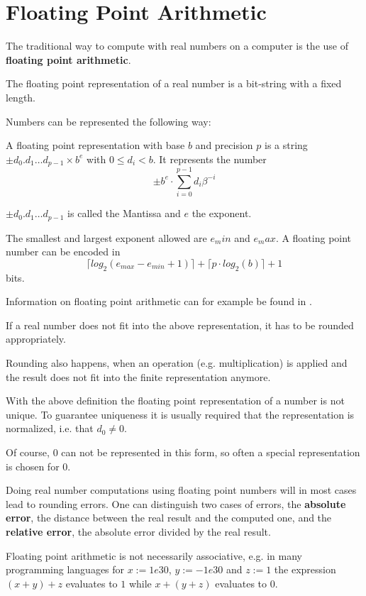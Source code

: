 \section{Floating Point Arithmetic}
The traditional way to compute with real numbers on a computer is the use 
of \textbf{floating point arithmetic}. 

The floating point representation of a real number is a bit-string with a fixed
length.

Numbers can be represented the following way:
\begin{definition}\label{def: floating point number}
	A floating point representation with base $b$ and precision $p$
	is a string $\pm d_0 . d_1 \dots d_{p-1} \times b^e$ with $0 \leq d_i < b$.	
	It represents the number
	$$ \pm b^e \cdot \sum_{i=0}^{p-1} d_i\beta^{-i} $$ 

	$\pm d_0 . d_1 \dots d_{p-1}$ is called the Mantissa and $e$ the exponent.
	
	The smallest and largest exponent allowed are $e_min$ and $e_max$.
	A floating point number can be encoded in
	$$ \lceil log_2(e_{max}-e_{min}+1) \rceil + \lceil  p \cdot log_2 (b) \rceil + 1 $$
	bits.
\end{definition}

Information on floating point arithmetic can for example be found in
\cite{Goldberg1991}.

If a real number does not fit into the above representation, it has to be
rounded appropriately.

Rounding also happens, when an operation (e.g. multiplication) is applied and
the result does not fit into the finite representation anymore.

With the above definition the floating point representation of a number is not
unique. 
To guarantee uniqueness it is usually required that the representation  is normalized, i.e. that $d_0 \neq 0$. 

Of course, $0$ can not be represented in this form, so often a special
representation is chosen for $0$.

Doing real number computations using floating point numbers will in most cases
lead to rounding errors.
One can distinguish two cases of errors, the \textbf{absolute error}, the
distance between the real result and the computed one, and the \textbf{relative
error}, the absolute error divided by the real result.

Floating point arithmetic is not necessarily associative, e.g. in many
programming languages for $x := 1e30$, $y := -1e30$ and $z := 1$ the expression
$(x+y)+z$ evaluates to $1$ while $x+(y+z)$ evaluates to $0$.
